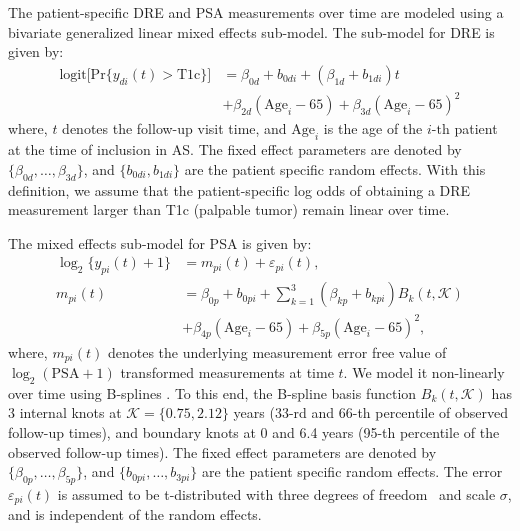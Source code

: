The patient-specific DRE and PSA measurements over time are modeled using a bivariate generalized linear mixed effects sub-model. The sub-model for DRE is given by:
\begin{equation}
\label{eq:long_model_dre}
\begin{split}
    \mbox{logit} \big[\mbox{Pr}\{y_{di}(t) > \mbox{T1c}\}\big] &= \beta_{0d} + b_{0di} + (\beta_{1d} + b_{1di}) t\\
    &+ \beta_{2d} (\mbox{Age}_i-65) + \beta_{3d} (\mbox{Age}_i-65)^2
    \end{split}
\end{equation}
where, $t$ denotes the follow-up visit time, and $\mbox{Age}_i$ is the age of the ${i\mbox{-th}}$ patient at the time of inclusion in AS. The fixed effect parameters are denoted by ${\{\beta_{0d}, \ldots, \beta_{3d}\}}$, and ${\{b_{0di}, b_{1di}\}}$ are the patient specific random effects. With this definition, we assume that the patient-specific log odds of obtaining a DRE measurement larger than T1c (palpable tumor) remain linear over time. 

The mixed effects sub-model for PSA is given by:
\begin{equation}
\label{eq:long_model_psa}
\begin{split}
    \log_2 \big\{y_{pi}(t) + 1\big\} &= m_{pi}(t) + \varepsilon_{pi}(t),\\
    m_{pi}(t) &= \beta_{0p} + b_{0pi} + \sum_{k=1}^3 (\beta_{kp} + b_{kpi})  B_k(t,\mathcal{K})\\ 
    &+ \beta_{4p} (\mbox{Age}_i-65) + \beta_{5p} (\mbox{Age}_i-65)^2,
    \end{split}
\end{equation}
where, $m_{pi}(t)$ denotes the underlying measurement error free value of $\log_2 (\mbox{PSA} + 1)$ transformed \citep{pearson1994mixed,lin2000latent} measurements at time $t$. We model it non-linearly over time using B-splines \citep{de1978practical}. To this end, the B-spline basis function $B_k(t, \mathcal{K})$ has 3 internal knots at $\mathcal{K} = \{0.75, 2.12\}$ years (33-rd and 66-th percentile of observed follow-up times), and boundary knots at 0 and 6.4 years (95-th percentile of the observed follow-up times). The fixed effect parameters are denoted by ${\{\beta_{0p},\ldots,\beta_{5p}\}}$, and ${\{b_{0pi}, \ldots, b_{3pi}\}}$ are the patient specific random effects. The error $\varepsilon_{pi}(t)$ is assumed to be t-distributed with three degrees of freedom~\citep{tomer2019personalized} and scale $\sigma$, and is independent of the random effects. 


